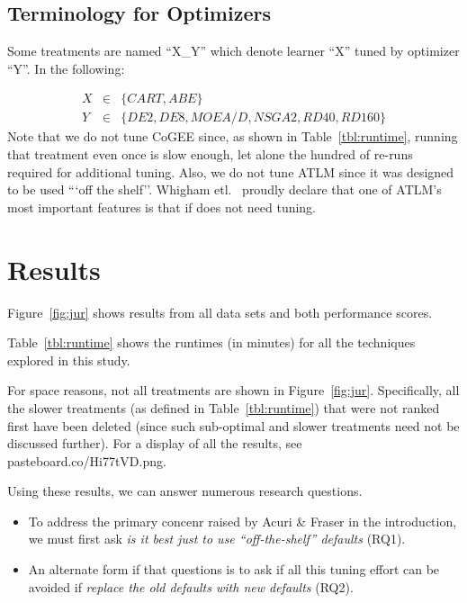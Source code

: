 \documentclass[10pt,conference]{IEEEtran}
\newcommand{\bi}{\begin{itemize}}
\newcommand{\ei}{\end{itemize}}
\begin{document}
 

\subsection{Terminology for Optimizers}

Some treatments are named ``X\_Y'' which  denote learner ``X'' tuned by optimizer ``Y''.
In the following: 

{\small \begin{eqnarray} 
X &\in &\{\mathit{CART},\mathit{ABE}\}\nonumber\\
Y &\in &\{\mathit{DE2},\mathit{DE8},\mathit{MOEA/D},\mathit{NSGA2},\mathit{RD40}, \mathit{RD160}\}\nonumber
\end{eqnarray}}
Note that we do not tune CoGEE since, as shown in Table~\ref{tbl:runtime}, running that treatment even once is slow enough, let alone the hundred of re-runs required for additional tuning. Also, we do not tune ATLM since it was designed to be used ```off the shelf''.  Whigham etl.~\cite{Whigham:2015} proudly declare that one of ATLM's most important features is that if does not need tuning.




\section{Results}
 
 Figure~\ref{fig:jur} shows results from all
 data sets and both performance scores. 
 
 
 Table~\ref{tbl:runtime} shows the runtimes (in minutes) for all
 the techniques explored in this study.
 
 For space reasons,
 not 
 all treatments are shown in Figure~\ref{fig:jur}. Specifically, all the slower treatments
 (as defined in Table~\ref{tbl:runtime}) that were not ranked first   have been deleted (since such sub-optimal and slower
 treatments need not be discussed further). For a display of all the  results, see pasteboard.co/Hi77tVD.png.
 
 Using these results, we can answer numerous research questions.
 \bi
 \item To address the primary concenr raised by Acuri \& Fraser in the introduction,
 we must  first ask {\em is it best just to use ``off-the-shelf'' defaults} (RQ1).
 \item An alternate form if that questions is to ask if all this tuning
 effort can be avoided if  {\em  replace the old defaults with new defaults} (RQ2).
\ei
\end{document}
